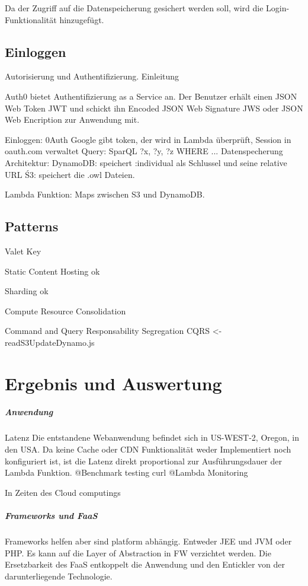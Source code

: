 \documentclass[
12pt,
english,
ngerman,
headsepline,
twoside,
openright,
numbers=noenddot,version=first
]{scrreprt}
\begin{document}
Da der Zugriff auf die Datenspeicherung gesichert werden soll, wird die Login-Funktionalität hinzugefügt.

\section{Einloggen}

Autorisierung und Authentifizierung. Einleitung

Auth0 bietet Authentifizierung as a Service an. Der Benutzer erhält einen JSON Web Token JWT und schickt ihn Encoded JSON Web Signature JWS oder JSON Web Encription zur Anwendung mit.


Einloggen: 0Auth Google gibt token, der wird in Lambda überprüft, Session in oauth.com verwaltet
Query: SparQL ?x, ?y, ?z WHERE ...
Datenspecherung Architektur:
DynamoDB: speichert :individual als Schlussel und seine relative URL
Ś3: speichert die .owl Dateien.

Lambda Funktion: Maps zwischen S3 und DynamoDB.

\section{Patterns}

Valet Key \cite{homer2014cloud}

Static Content Hosting ok

Sharding ok

Compute Resource Consolidation

Command and Query Responsability Segregation CQRS <- readS3UpdateDynamo.js

\chapter{Ergebnis und Auswertung}

\paragraph{Anwendung}{Latenz}
Die entstandene Webanwendung befindet sich in US-WEST-2, Oregon, in den USA. 
Da keine Cache oder CDN Funktionalität weder Implementiert noch konfiguriert ist, ist die Latenz direkt proportional zur Ausführungsdauer der Lambda Funktion.
@Benchmark testing curl 
@Lambda Monitoring

In Zeiten des Cloud computings 
\paragraph{Frameworks und FaaS}
Frameworks helfen aber sind platform abhängig. Entweder JEE und JVM oder PHP.
Es kann auf die Layer of Abstraction in FW verzichtet werden. 
Die Ersetzbarkeit des FaaS entkoppelt die Anwendung und den Entickler von der darunterliegende Technologie.
\end{document}
